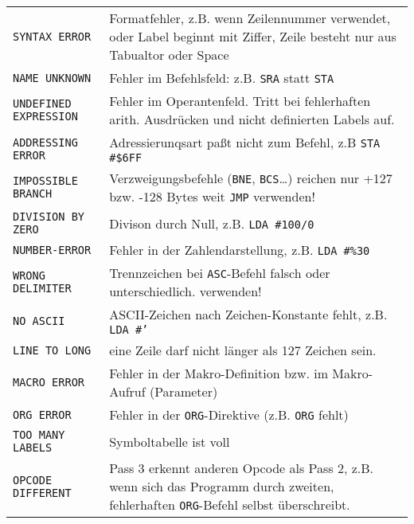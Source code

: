 \documentclass[10pt,a4paper,twoside,final,openright,titlepage]{memoir}
\newcommand{\key}[1]{\keystroke{\tiny #1}}
\begin{document}
\begin{longtable}{p{11em}p{20em}}
\texttt{SYNTAX ERROR} &	Formatfehler, z.B. wenn Zeilennummer
		verwendet, oder Label beginnt mit Ziffer,
		Zeile besteht nur aus Tabualtor oder Space \\

\texttt{NAME UNKNOWN} & 	Fehler im Befehlsfeld: z.B. \texttt{SRA} statt \texttt{STA} \\

\texttt{UNDEFINED EXPRESSION} & Fehler im Operantenfeld. Tritt bei
		fehlerhaften arith. Ausdrücken und nicht
		definierten Labels auf. \\

\texttt{ADDRESSING ERROR} & Adressierunqsart paßt nicht zum
		Befehl, z.B \texttt{STA \#\$6FF} \\

\texttt{IMPOSSIBLE BRANCH} & Verzweigungsbefehle (\texttt{BNE}, \texttt{BCS}\dots)
		reichen nur +127 bzw. -128 Bytes weit \texttt{JMP} verwenden! \\

\texttt{DIVISION BY ZERO} & Divison durch Null, z.B. \texttt{LDA \#100/0} \\

\texttt{NUMBER-ERROR} &	Fehler in der Zahlendarstellung,
		z.B. \texttt{LDA \#\%30} \\

\texttt{WRONG DELIMITER} & Trennzeichen bei \texttt{ASC}-Befehl falsch oder 
			unterschiedlich. \key{SHIFT-2} verwenden! \\

\texttt{NO ASCII} & 	ASCII-Zeichen nach Zeichen-Konstante
		fehlt, z.B. \texttt{LDA \#'}\key{RETURN} \\

\texttt{LINE TO LONG} & 	eine Zeile darf nicht länger als 127 Zeichen sein. \\

\texttt{MACRO ERROR} &	Fehler in der Makro-Definition bzw. im Makro-Aufruf (Parameter) \\

\texttt{ORG ERROR} &	Fehler in der \texttt{ORG}-Direktive (z.B. \texttt{ORG} fehlt) \\

\texttt{TOO MANY LABELS} & Symboltabelle ist voll \\

\texttt{OPCODE DIFFERENT} & Pass 3 erkennt anderen Opcode als
		Pass 2, z.B. wenn sich das Programm durch
		zweiten, fehlerhaften \texttt{ORG}-Befehl selbst
		überschreibt. \\
\end{longtable}
\bigskip
\end{document}
